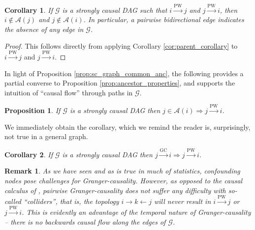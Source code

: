 \documentclass{statsoc}
\def\gc{\overset{\text{GC}}{\rightarrow}}  %
\def\pwgc{\overset{\text{PW}}{\rightarrow}}  %
\def\gcg{\mathcal{G}}  %
\newcommand{\pa}[1]{pa(#1)}  %
\newcommand{\anc}[1]{\mathcal{A}(#1)}  %
\newtheorem{corollary}{Corollary}
\newtheorem{proposition}{Proposition}
\newtheorem{remark}{Remark}
\begin{document}
\begin{corollary}
  \label{cor:bidirectional_edge}
  If $\gcg$ is a strongly causal DAG such that $i \pwgc j$ and
  $j \pwgc i$, then $i \not\in \anc{j}$ and $j \not\in \anc{i}$.  In
  particular, a pairwise bidirectional edge indicates the absence of
  any edge in $\gcg$.
\end{corollary}
\begin{proof}
  This follows directly from applying Corollary
  \ref{cor:parent_corollary} to $i \pwgc j$ and $j \pwgc i$.
\end{proof}

In light of Proposition \ref{prop:sc_graph_common_anc}, the following
provides a partial converse to Proposition
\ref{prop:ancestor_properties}, and supports the intuition of ``causal
flow'' through paths in $\gcg$.

\begin{proposition}
  \label{prop:pwgc_anc}
  If $\gcg$ is a strongly causal DAG then $j \in \anc{i} \Rightarrow j \pwgc i$.
\end{proposition}

We immediately obtain the corollary, which we remind the reader is,
surprisingly, not true in a general graph.

\begin{corollary}
  \label{cor:gc_implies_pwgc}
  If $\gcg$ is a strongly causal DAG then $j \gc i \Rightarrow j \pwgc i$.
\end{corollary}

\begin{remark}
  As we have seen and as is true in much of statistics, confounding
  nodes pose challenges for Granger-causality.  However, as opposed to
  the causal calculus of \cite{pearl2009causality}, pairwise
  Granger-causality does not suffer any difficulty with so-called
  ``colliders'', that is, the topology $i \rightarrow k \leftarrow j$ will never result
  in $i \pwgc j$ or $j \pwgc i$.  This is evidently an advantage of
  the \textit{temporal} nature of Granger-causality -- there is no
  backwards causal flow along the edges of $\gcg$.
\end{remark}
\end{document}
